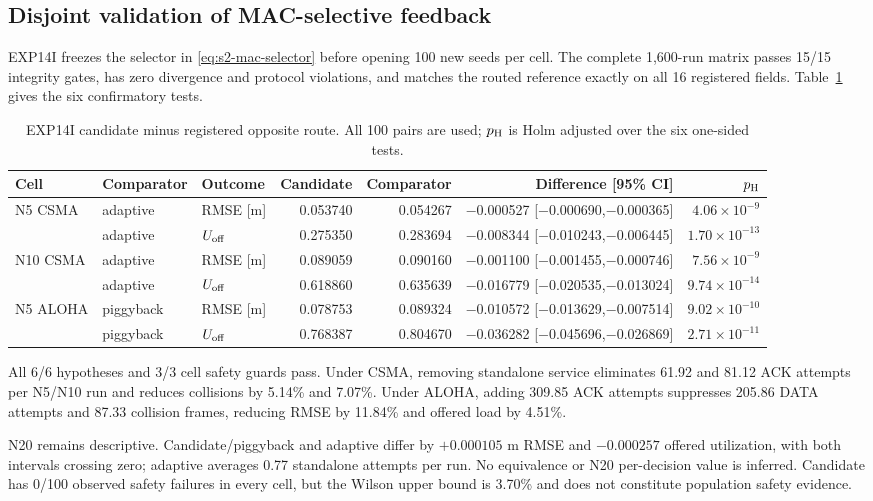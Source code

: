 \subsection{Disjoint validation of MAC-selective feedback}

EXP14I freezes the selector in \eqref{eq:s2-mac-selector} before opening 100
new seeds per cell. The complete 1,600-run matrix passes 15/15 integrity gates,
has zero divergence and protocol violations, and matches the routed reference
exactly on all 16 registered fields. Table~\ref{tab:s2-exp14i} gives the six
confirmatory tests.

\begin{table}[t]
\centering
\caption{EXP14I candidate minus registered opposite route. All 100 pairs are
used; $p_{\rm H}$ is Holm adjusted over the six one-sided tests.}
\label{tab:s2-exp14i}
\scriptsize
\begin{tabular}{lllrrrr}
\toprule
Cell & Comparator & Outcome & Candidate & Comparator & Difference [95\% CI] & $p_{\rm H}$ \\
\midrule
N5 CSMA & adaptive & RMSE [m] & 0.053740 & 0.054267 &
$-$0.000527 [$-$0.000690,$-$0.000365] & $4.06\times10^{-9}$ \\
 & adaptive & $U_{\rm off}$ & 0.275350 & 0.283694 &
$-$0.008344 [$-$0.010243,$-$0.006445] & $1.70\times10^{-13}$ \\
N10 CSMA & adaptive & RMSE [m] & 0.089059 & 0.090160 &
$-$0.001100 [$-$0.001455,$-$0.000746] & $7.56\times10^{-9}$ \\
 & adaptive & $U_{\rm off}$ & 0.618860 & 0.635639 &
$-$0.016779 [$-$0.020535,$-$0.013024] & $9.74\times10^{-14}$ \\
N5 ALOHA & piggyback & RMSE [m] & 0.078753 & 0.089324 &
$-$0.010572 [$-$0.013629,$-$0.007514] & $9.02\times10^{-10}$ \\
 & piggyback & $U_{\rm off}$ & 0.768387 & 0.804670 &
$-$0.036282 [$-$0.045696,$-$0.026869] & $2.71\times10^{-11}$ \\
\bottomrule
\end{tabular}
\end{table}

All 6/6 hypotheses and 3/3 cell safety guards pass. Under CSMA, removing
standalone service eliminates 61.92 and 81.12 ACK attempts per N5/N10 run and
reduces collisions by 5.14\% and 7.07\%. Under ALOHA, adding 309.85 ACK
attempts suppresses 205.86 DATA attempts and 87.33 collision frames, reducing
RMSE by 11.84\% and offered load by 4.51\%.

N20 remains descriptive. Candidate/piggyback and adaptive differ by
$+0.000105$ m RMSE and $-0.000257$ offered utilization, with both intervals
crossing zero; adaptive averages 0.77 standalone attempts per run. No
equivalence or N20 per-decision value is inferred. Candidate has 0/100 observed
safety failures in every cell, but the Wilson upper bound is 3.70\% and does
not constitute population safety evidence.

